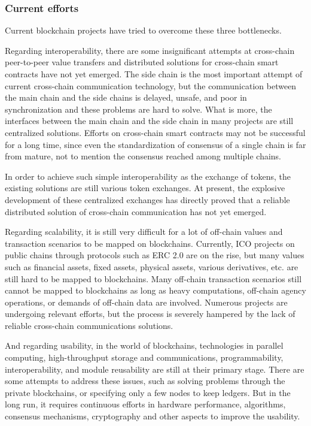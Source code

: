\documentclass[a4paper,12pt]{article}
\begin{document}
\subsubsection{Current efforts}

Current blockchain projects have tried to overcome these three bottlenecks.

Regarding interoperability, there are some insignificant attempts at cross-chain peer-to-peer value transfers and distributed solutions for cross-chain smart contracts have not yet emerged. The side chain is the most important attempt of current cross-chain communication technology, but the communication between the main chain and the side chains is delayed, unsafe, and poor in synchronization and these problems are hard to solve. What is more, the interfaces between the main chain and the side chain in many projects are still centralized solutions. Efforts on cross-chain smart contracts may not be successful for a long time, since even the standardization of consensus of a single chain is far from mature, not to mention the consensus reached among multiple chains. 

In order to achieve such simple interoperability as the exchange of tokens, the existing solutions are still various token exchanges. At present, the explosive development of these centralized exchanges has directly proved that a reliable distributed solution of cross-chain communication has not yet emerged.

Regarding scalability, it is still very difficult for a lot of off-chain values and transaction scenarios to be mapped on blockchains. Currently, ICO projects on public chains through protocols such as ERC 2.0 are on the rise, but many values such as financial assets, fixed assets, physical assets, various derivatives, etc. are still hard to be mapped to blockchains. Many off-chain transaction scenarios still cannot be mapped to blockchains as long as heavy computations, off-chain agency operations, or demands of off-chain data are involved. Numerous projects are undergoing relevant efforts, but the process is severely hampered by the lack of reliable cross-chain communications solutions.

And regarding usability, in the world of blockchains, technologies in parallel computing, high-throughput storage and communications, programmability, interoperability, and module reusability are still at their primary stage. There are some attempts to address these issues, such as solving problems through the private blockchains, or specifying only a few nodes to keep ledgers. But in the long run, it requires continuous efforts in hardware performance, algorithms, consensus mechanisms, cryptography and other aspects to improve the usability.
\end{document}
